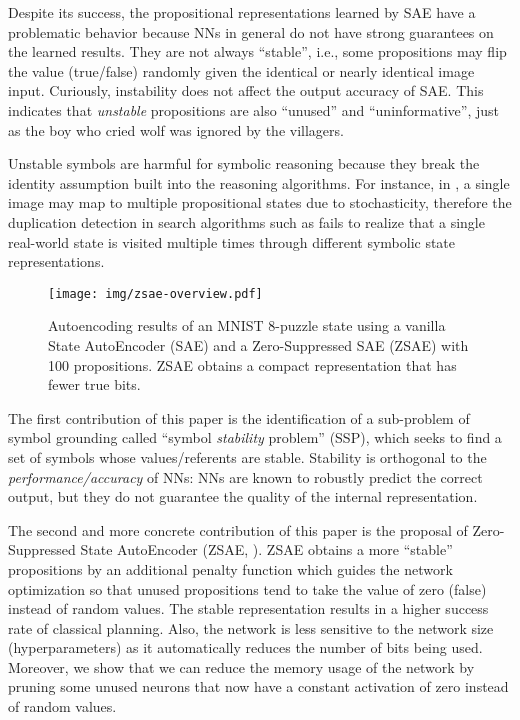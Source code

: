 Despite its success,
the propositional representations learned by SAE have a problematic behavior
because NNs in general do not have strong guarantees on the learned results.
They are not always ``stable'', i.e.,
some propositions may flip the value (true/false) randomly
given the identical or nearly identical image input.
% 
% 
Curiously, instability does not affect the output accuracy of SAE.
This indicates that \emph{unstable} propositions are also ``unused'' and ``uninformative'',
just as the boy who cried wolf was ignored by the villagers.

Unstable symbols are harmful for symbolic reasoning because
they break the identity assumption built into the reasoning algorithms.
For instance, in \latentplanner, 
a single image may map to multiple propositional states due to stochasticity,
therefore the duplication detection in search algorithms such as \astar \cite{hart1968formal}
fails to realize that a single real-world state is visited multiple times through
different symbolic state representations.

\begin{figure}[tb]
 \centering
 \texttt{[image: img/zsae-overview.pdf]}
 \caption{
Autoencoding results of an MNIST 8-puzzle state
using a vanilla State AutoEncoder (SAE) \cite{Asai2018} and a Zero-Suppressed SAE (ZSAE) with 100 propositions.
ZSAE obtains a compact representation that has fewer true bits.}
 \label{zsae-overview}
\end{figure}

The first contribution of this paper is the identification of a sub-problem of symbol grounding
called ``symbol \emph{stability} problem'' (SSP), which seeks to find a set of symbols
whose values/referents are stable.
Stability is orthogonal to the \emph{performance/accuracy} of NNs:
NNs are known to robustly predict the correct output, but they do not guarantee
the quality of the internal representation.

The second and more concrete contribution of this paper is
the proposal of Zero-Suppressed State AutoEncoder (ZSAE, ).
ZSAE obtains a more ``stable'' propositions
by an additional penalty function which
guides the network optimization so that unused propositions tend to 
take the value of zero (false) instead of random values.
% 
The stable representation results in a higher success rate of classical planning.
Also, the network is less sensitive to the network size (hyperparameters)
as it automatically reduces the number of bits being used.
Moreover, we show that we can reduce the memory usage of the network
by pruning some unused neurons
that now have a constant activation of zero instead of random values.

